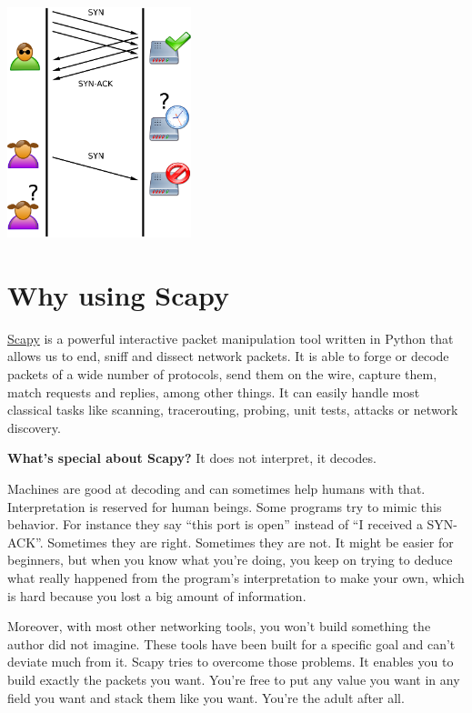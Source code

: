 \documentclass[11pt]{article}
\begin{document}
\begin{center}
\vfill
\includegraphics[width=0.4\textwidth]{tcp-synflood.png}\\[1cm]
\end{center}

\clearpage

\section{Why using Scapy}
\href{https://scapy.net}{Scapy} is a powerful interactive packet manipulation tool written in Python that allows us to end, sniff and dissect network packets. It is able to forge or decode packets of a wide number of protocols, send them on the wire, capture them, match requests and replies, among other things. It can easily handle most classical tasks like scanning, tracerouting, probing, unit tests, attacks or network discovery.\vspace{5mm}

\textbf{What's special about Scapy?} It does not interpret, it decodes.\vspace{5mm}

Machines are good at decoding and can sometimes help humans with that. Interpretation is reserved for human beings. Some programs try to mimic this behavior. For instance they say “this port is open” instead of “I received a SYN-ACK”. Sometimes they are right. Sometimes they are not. It might be easier for beginners, but when you know what you’re doing, you keep on trying to deduce what really happened from the program’s interpretation to make your own, which is hard because you lost a big amount of information.\vspace{5mm}

Moreover, with most other networking tools, you won’t build something the author did not imagine. These tools have been built for a specific goal and can’t deviate much from it. Scapy tries to overcome those problems. It enables you to build exactly the packets you want. You’re free to put any value you want in any field you want and stack them like you want. You’re the adult after all.\vspace{5mm}
\end{document}
